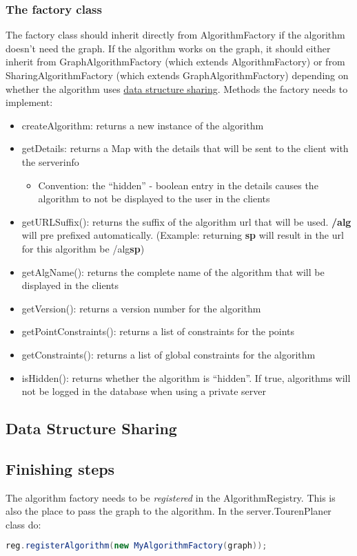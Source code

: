 \documentclass[ngerman,titlepage,parskip=true]{scrartcl}
\begin{document}
	 \subsubsection{The factory class}
	 The factory class should inherit directly from AlgorithmFactory if the algorithm doesn't need the graph. If the algorithm works on the graph, it should either inherit from GraphAlgorithmFactory (which extends AlgorithmFactory) or from SharingAlgorithmFactory (which extends GraphAlgorithmFactory) depending on whether the algorithm uses \hyperref[sharing]{data structure sharing}.
	 Methods the factory needs to implement:
	 \begin{itemize}
	   \item createAlgorithm: returns a new instance of the algorithm
	   \item getDetails: returns a Map with the details that will be sent to the client with the serverinfo
	   \begin{itemize}
	     \item Convention: the ``hidden'' - boolean entry in the details causes the algorithm to not be displayed to the user in the clients
	   \end{itemize}
		\item getURLSuffix(): returns the suffix of the algorithm url that will be used. \textbf{/alg} will pre prefixed automatically. (Example: returning \textbf{sp} will result in the url for this algorithm be /alg\textbf{sp})
		\item getAlgName(): returns the complete name of the algorithm that will be displayed in the clients
		\item getVersion(): returns a version number for the algorithm
		\item getPointConstraints(): returns a list of constraints for the points
		\item getConstraints(): returns a list of global constraints for the algorithm
		\item isHidden(): returns whether the algorithm is ``hidden''. If true, algorithms will not be logged in the database when using a private server
	 \end{itemize}
	 
  \label{sharing}
  \subsection{Data Structure Sharing}

  \subsection{Finishing steps}
  The algorithm factory needs to be \textit{registered} in the AlgorithmRegistry. This is also the place to pass the graph to the algorithm.
  In the server.TourenPlaner class do:
  \begin{lstlisting}[language=java,caption=register your algorithm factory]
          reg.registerAlgorithm(new MyAlgorithmFactory(graph));
  \end{lstlisting}
  
\end{document}
